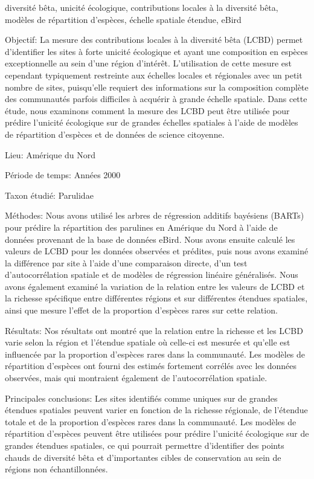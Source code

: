 \begin{resume}{diversité bêta, unicité écologique, contributions locales à la diversité bêta, modèles de répartition d'espèces, échelle spatiale étendue, eBird}
  
  Objectif: La mesure des contributions locales à la diversité bêta (LCBD) permet d'identifier les sites à forte unicité écologique et ayant une composition en espèces exceptionnelle au sein d'une région d'intérêt. L'utilisation de cette mesure est cependant typiquement restreinte aux échelles locales et régionales avec un petit nombre de sites, puisqu'elle requiert des informations sur la composition complète des communautés parfois difficiles à acquérir à grande échelle spatiale. Dans cette étude, nous examinons comment la mesure des LCBD peut être utilisée pour prédire l'unicité écologique sur de grandes échelles spatiales à l'aide de modèles de répartition d'espèces et de données de science citoyenne.

  Lieu: Amérique du Nord
  
  Période de temps: Années 2000
  
  Taxon étudié: Parulidae
  
  Méthodes: Nous avons utilisé les arbres de régression additifs bayésiens (BARTs) pour prédire la répartition des parulines en Amérique du Nord à l'aide de données provenant de la base de données eBird. Nous avons ensuite calculé les valeurs de LCBD pour les données observées et prédites, puis nous avons examiné la différence par site à l'aide d'une comparaison directe, d'un test d'autocorrélation spatiale et de modèles de régression linéaire généralisés. Nous avons également examiné la variation de la relation entre les valeurs de LCBD et la richesse spécifique entre différentes régions et sur différentes étendues spatiales, ainsi que mesure l'effet de la proportion d'espèces rares sur cette relation.
  
  Résultats: Nos résultats ont montré que la relation entre la richesse et les LCBD varie selon la région et l'étendue spatiale où celle-ci est mesurée et qu'elle est influencée par la proportion d'espèces rares dans la communauté. Les modèles de répartition d'espèces ont fourni des estimés fortement corrélés avec les données observées, mais qui montraient également de l'autocorrélation spatiale.
  
  Principales conclusions: Les sites identifiés comme uniques sur de grandes étendues spatiales peuvent varier en fonction de la richesse régionale, de l'étendue totale et de la proportion d'espèces rares dans la communauté. Les modèles de répartition d'espèces peuvent être utilisées pour prédire l'unicité écologique sur de grandes étendues spatiales, ce qui pourrait permettre d'identifier des points chauds de diversité bêta et d'importantes cibles de conservation au sein de régions non échantillonnées.

\end{resume}

